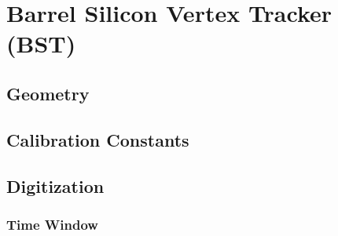 \section{Barrel Silicon Vertex Tracker (BST)}


\subsection{Geometry}

\subsection{Calibration Constants}


\subsection{Digitization}

\subsubsection{Time Window}
